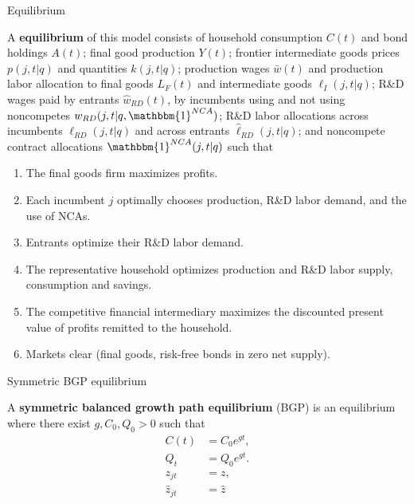 \documentclass[english,usenames,dvipsnames]{beamer}
\begin{document}
\begin{frame}{Equilibrium}\label{definition:equilibrium}
	\hyperlink{model:firm_ownership}{}
\begin{definition}
	\tiny
	A \textbf{equilibrium} of this model consists of household consumption $C(t)$ and bond holdings $A(t)$; final good production $Y(t)$; frontier intermediate goods prices $p(j,t|q)$ and quantities $k(j,t|q)$; production wages $\bar{w}(t)$ and production labor allocation to final goods $L_{F}(t)$ and intermediate goods $\ell_I(j,t|q)$; R\&D wages paid by entrants $\hat{w}_{RD}(t)$, by incumbents using and not using noncompetes $w_{RD}(j,t|q,\mathbbm{1}^{NCA})$; R\&D labor allocations across incumbents $\ell_{RD}(j,t|q)$ and across entrants $\hat{\ell}_{RD}(j,t|q)$; and noncompete contract allocations $\mathbbm{1}^{NCA}(j,t|q)$ such that 
	\begin{enumerate}
		\item The final goods firm maximizes profits.
		\item Each incumbent $j$ optimally chooses production, R\&D labor demand, and the use of NCAs.
		\item Entrants optimize their R\&D labor demand.
		\item The representative household optimizes production and R\&D labor supply, consumption and savings.
		\item The competitive financial intermediary maximizes the discounted present value of profits remitted to the household.
		\item Markets clear (final goods, risk-free bonds in zero net supply).
	\end{enumerate}
\end{definition}
\end{frame}

\begin{frame}{Symmetric BGP equilibrium}\label{definition:symmetric_bgp}
	\hyperlink{characterizing_BGP}{}
	\begin{definition}
	A \textbf{symmetric balanced growth path equilibrium} (BGP) is an equilibrium where there exist $g, C_0, Q_0 > 0$ such that
	\begin{align*}
		C(t) &= C_0 e^{gt}, \\
		Q_t &= Q_0 e^{gt}. \\
		z_{jt} &= z, \\
		\hat{z}_{jt} &= \hat{z}
	\end{align*}
	\end{definition}
\end{frame}
\end{document}
